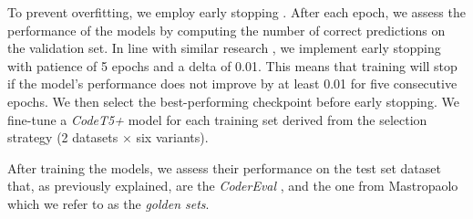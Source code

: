 To prevent overfitting, we employ early stopping \cite{prechelt2002early}. After each epoch, we assess the performance of the models by computing the number of correct predictions on the validation set. 
In line with similar research \cite{mastropaolo2023towards,ciniselli2024generalizability}, we implement early stopping with patience of 5 epochs and a delta of 0.01. This means that training will stop if the model's performance does not improve by at least 0.01 for five consecutive epochs. We then select the best-performing checkpoint before early stopping.
We fine-tune a \emph{CodeT5+} model for each training set derived from the selection strategy  (2 datasets $\times$ six variants).

After training the models, we assess their performance on the test set dataset that, as previously explained, are the \textit{CoderEval} \cite{yu2024codereval}, and the one from Mastropaolo \etal \cite{mastropaolo2023robustness} which we refer to as the \textit{golden sets}.

